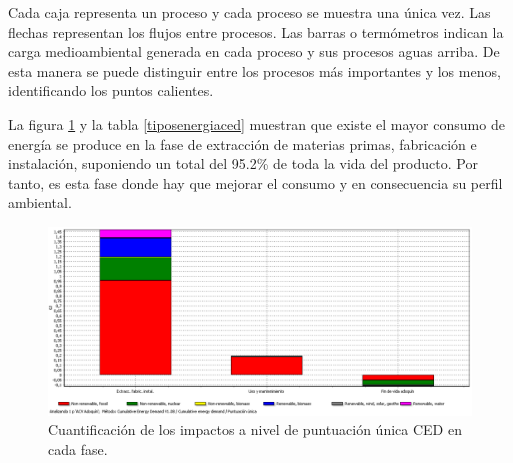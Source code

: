 Cada caja representa un proceso y cada proceso se muestra una única vez. Las flechas representan los flujos entre procesos. Las barras o termómetros indican la carga medioambiental generada en cada proceso y sus procesos aguas arriba. De esta manera se puede distinguir entre los procesos más importantes y los menos, identificando los puntos calientes.

La figura \ref{fig:ced_puntuacionunica} y la tabla \ref{tiposenergiaced} muestran que existe el mayor consumo de energía se produce en la fase de extracción de materias primas, fabricación e instalación, suponiendo un total del 95.2\% de toda la vida del producto. Por tanto, es esta fase donde hay que mejorar el consumo y en consecuencia su perfil ambiental.

\begin{figure}[!htb]
\centering
\includegraphics[width=15cm]{img/ced_puntuacionunica.png}
\caption{Cuantificación de los impactos a nivel de puntuación única CED en cada fase.}
\label{fig:ced_puntuacionunica}
\end{figure}

